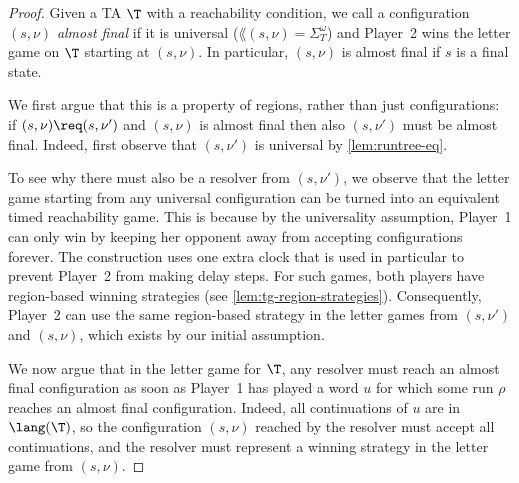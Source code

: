\begin{proof}
    Given a TA $\T$ with a reachability condition, we call a configuration $(s,\nu)$ \emph{almost final} if
    it is universal
    ($\lang(s,\nu)=\Sigma_T^\omega$)
    and
    Player~2 wins the letter game on $\T$ starting at $(s,\nu)$. 	
    In particular, $(s,\nu)$ is almost final if $s$ is a final state. 

We first argue that this is a property of regions, rather than just configurations:
if $(s,\nu)\req(s,\nu')$ and $(s,\nu)$ is almost final then also $(s,\nu')$ must be almost final.
Indeed, first observe that $(s,\nu')$ is universal by \cref{lem:runtree-eq}. 

To see why there must also be a resolver from $(s,\nu')$,
we observe that the letter game starting from any universal configuration
can be turned into an equivalent timed reachability game.
This is because by the universality assumption, Player~1 can only win by
keeping her opponent away from accepting configurations forever.
The construction uses one extra clock that is used in particular to prevent Player~2 from making delay steps.
For such games, both players have region-based winning strategies (see \cref{lem:tg-region-strategies}).
Consequently, Player~2 can use the same region-based strategy in the letter games
from $(s,\nu')$ and $(s,\nu)$, which exists by our initial assumption.



We now argue that in the letter game for $\T$,
any resolver must reach an almost final configuration as soon as Player~1 has played a word $u$ for which some run $\rho$ reaches an almost final configuration. Indeed, all continuations of $u$ are in $\lang(\T)$, so the configuration $(s,\nu)$ reached by the resolver must accept all continuations, and the resolver must represent a winning strategy in the letter game from $(s,\nu)$.


\end{proof}
